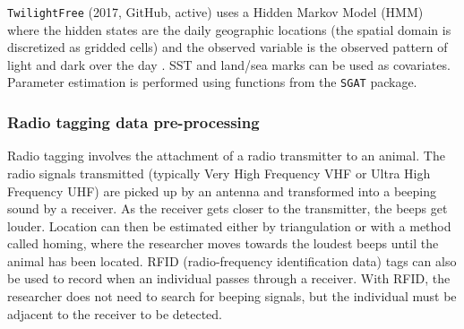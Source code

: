 \documentclass[a4paper,12pt]{article}
\newcommand{\Rpkg}[1]{\texttt{#1}}
\begin{document}
\begin{itemize}
		\Rpkg{TwilightFree} (2017, GitHub, active) \citep{RTwilightFree} uses a Hidden Markov Model (HMM) where the hidden states are the daily geographic locations (the spatial domain is discretized as gridded cells) and the observed variable is the observed pattern of light and dark over the day \citep{Bindoff2017}. SST and land/sea marks can be used as covariates. Parameter estimation is performed using functions from the \Rpkg{SGAT} package. %
	\end{itemize}
	
	
	\subsubsection*{Radio tagging data pre-processing}
	
	Radio tagging involves the attachment of a radio transmitter to an animal. The radio signals transmitted (typically Very High Frequency VHF or Ultra High Frequency UHF) are picked up by an antenna and transformed into a beeping sound by a receiver. As the receiver gets closer to the transmitter, the beeps get louder. Location can then be estimated either by triangulation or with a method called homing, where the researcher moves towards the loudest beeps until the animal has been located. RFID (radio-frequency identification data) tags can also be used to record when an individual passes through a receiver. With RFID, the researcher does not need to search for beeping signals, but the individual must be adjacent to the receiver to be detected. %
	
\end{document}
